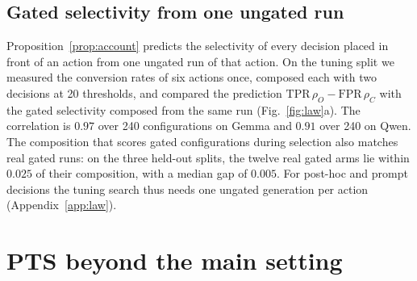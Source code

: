\subsection{Gated selectivity from one ungated run}
\label{ssec:law}

Proposition~\ref{prop:account} predicts the selectivity of every decision
placed in front of an action from one ungated run of that action. On the
tuning split we measured the conversion rates of six actions once, composed
each with two decisions at 20 thresholds, and compared the prediction
$\mathrm{TPR}\,\rho_O-\mathrm{FPR}\,\rho_C$ with the gated selectivity composed
from the same run (Fig.~\ref{fig:law}a). The correlation is $0.97$ over 240
configurations on Gemma and $0.91$ over 240 on Qwen. The composition that
scores gated configurations during selection also matches real gated runs: on
the three held-out splits, the twelve real gated arms lie within $0.025$ of
their composition, with a median gap of $0.005$. For post-hoc and prompt
decisions the tuning search thus needs one ungated generation per action
(Appendix~\ref{app:law}).

\section{PTS beyond the main setting}
\label{sec:transfer}

